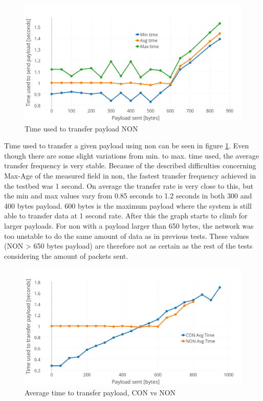\begin{figure}[h!]
    \centering
    \includegraphics[width=1.0\textwidth]{bytesPrSecondNewNON.png}    
    \caption{Time used to transfer payload NON}
    \label{fig:bytesPRSecond4}
\end{figure}

\noindent Time used to transfer a given payload using \gls{non} can be seen in figure \ref{fig:bytesPRSecond4}. Even though there are some slight variations from min. to max. time used, the average transfer frequency is very stable. Because of the described difficulties concerning Max-Age of the measured field in \gls{non}, the fastest transfer frequency achieved in the testbed was 1 second. On average the transfer rate is very close to this, but the min and max values vary from 0.85 seconds to 1.2 seconds in both 300 and 400 bytes payload. 600 bytes is the maximum payload where the system is still able to transfer data at 1 second rate. After this the graph starts to climb for larger payloads. For \gls{non} with a payload larger than 650 bytes, the network was too unstable to do the same amount of data as in previous tests. These values (NON > 650 bytes payload) are therefore not as certain as the rest of the tests considering the amount of packets sent.


\begin{figure}[h!]
    \centering
    \includegraphics[width=1.0\textwidth]{avgTimeCONNON.png}    
    \caption{Average time to transfer payload, CON vs NON}
    \label{fig:avgTimeCONNON}
\end{figure}




